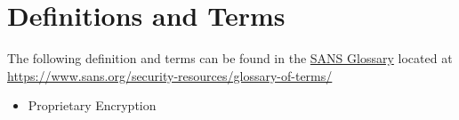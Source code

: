 \section{Definitions and Terms}
The following definition and terms can be found in the \href{https://www.sans.org/security-resources/glossary-of-terms/}{SANS Glossary} located at \url{https://www.sans.org/security-resources/glossary-of-terms/}
\begin{itemize}
\item
Proprietary Encryption
\end{itemize}
\CommonRevisionHistory
